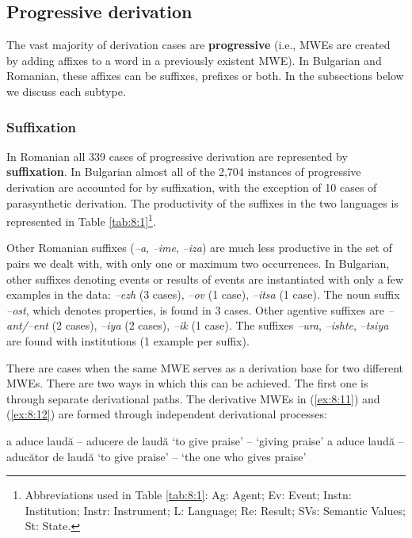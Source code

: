 \documentclass[output=paper]{langsci/langscibook}
\begin{document}
\subsection{Progressive derivation}

The vast majority of derivation cases are \textbf{progressive} (i.e.,
MWEs are created by adding affixes to a word in a previously existent
MWE). In Bulgarian and Romanian, these affixes can be suffixes,
prefixes or both. In the subsections below we discuss each subtype.

\subsubsection{Suffixation}
\label{suffication}

In Romanian all 339 cases of progressive derivation are represented by
\textbf{suffixation}. In Bulgarian almost all of the 2,704 instances of
progressive derivation are accounted for by suffixation, with the
exception of 10 cases of parasynthetic derivation. The productivity of
the suffixes in the two languages is represented in Table \ref{tab:8:1}\footnote{Abbreviations used in Table \ref{tab:8:1}: Ag: Agent; Ev: Event;  Instn: Institution; Instr: Instrument; L: Language; Re: Result; SVs: Semantic Values; St: State.}.

Other Romanian suffixes (\textit{–a}, \textit{–ime}, \textit{–iza}) are much less productive
in the set of pairs we dealt with, with only one or maximum two
occurrences. In Bulgarian, other suffixes denoting events or results of
events are instantiated with only a few examples in the data: \textit{–ezh} (3
cases), \textit{–ov} (1 case), \textit{–itsa} (1 case). The noun suffix \textit{–ost}, which
denotes properties, is found in 3 cases. Other agentive suffixes are
\textit{–ant/–ent} (2 cases), \textit{–iya} (2 cases), \textit{–ik} (1 case). The suffixes
\textit{–ura}, \textit{–ishte}, \textit{–tsiya} are found with institutions (1 example per
suffix).


There are cases when the same MWE serves as a derivation base for two
different MWEs. There are two ways in which this can be achieved. The
first one is through separate derivational paths. The derivative MWEs
in (\ref{ex:8:11}) and (\ref{ex:8:12}) are formed through independent derivational processes:



\begin{exe}
\ex \label{ex:8:11}
\settowidth{}
\begin{xlist}
\ex \label{ex:8:11a}
a aduce laudă  – aducere de laudă 
‘to give praise’ – ‘giving praise’
\ex \label{ex:8:11b}
a aduce laudă  – aducător de laudă  ‘to give praise’ – ‘the one
who gives praise’
\end{xlist}
\end{exe}
\end{document}

